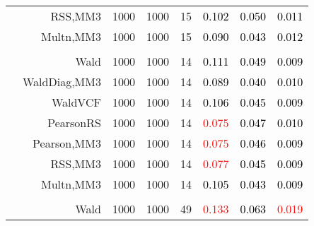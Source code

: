 \documentclass[
]{article}
\begin{document}
\begin{table}[H]
{\begin{tabular}[t]{lrrrrrrr}
\hspace{1em} & RSS,MM3 & 1000 & 1000 & 15 & \textcolor{black}{0.102} & \textcolor{black}{0.050} & \textcolor{black}{0.011}\\

\hspace{1em} & Multn,MM3 & 1000 & 1000 & 15 & \textcolor{black}{0.090} & \textcolor{black}{0.043} & \textcolor{black}{0.012}\\
\cmidrule{1-8}
\addlinespace[0.3em]
\multicolumn{8}{l}{\textbf{2F 10V}}\\
\hspace{1em} & Wald & 1000 & 1000 & 14 & \textcolor{black}{0.111} & \textcolor{black}{0.049} & \textcolor{black}{0.009}\\

\hspace{1em} & WaldDiag,MM3 & 1000 & 1000 & 14 & \textcolor{black}{0.089} & \textcolor{black}{0.040} & \textcolor{black}{0.010}\\

\hspace{1em} & WaldVCF & 1000 & 1000 & 14 & \textcolor{black}{0.106} & \textcolor{black}{0.045} & \textcolor{black}{0.009}\\

\hspace{1em} & PearsonRS & 1000 & 1000 & 14 & \textcolor{red}{0.075} & \textcolor{black}{0.047} & \textcolor{black}{0.010}\\

\hspace{1em} & Pearson,MM3 & 1000 & 1000 & 14 & \textcolor{red}{0.075} & \textcolor{black}{0.046} & \textcolor{black}{0.009}\\

\hspace{1em} & RSS,MM3 & 1000 & 1000 & 14 & \textcolor{red}{0.077} & \textcolor{black}{0.045} & \textcolor{black}{0.009}\\

\hspace{1em} & Multn,MM3 & 1000 & 1000 & 14 & \textcolor{black}{0.105} & \textcolor{black}{0.043} & \textcolor{black}{0.009}\\
\cmidrule{1-8}
\addlinespace[0.3em]
\multicolumn{8}{l}{\textbf{3F 15V}}\\
\hspace{1em} & Wald & 1000 & 1000 & 49 & \textcolor{red}{0.133} & \textcolor{black}{0.063} & \textcolor{red}{0.019}\\


\end{tabular}}
\end{table}
\end{document}
